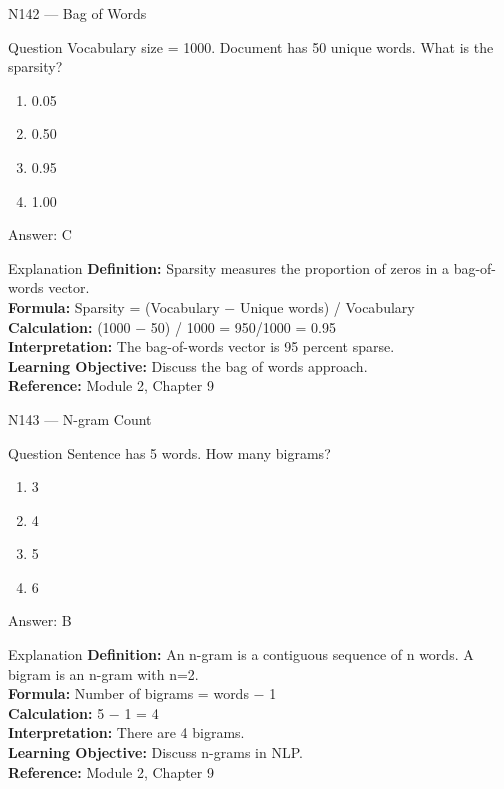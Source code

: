\documentclass[aspectratio=169,8pt]{beamer}
\begin{document}
	\begin{frame}{N142 --- Bag of Words}
		\begin{block}{Question}
			Vocabulary size = 1000. Document has 50 unique words. What is the sparsity?
			\begin{enumerate}
				\item 0.05
				\item 0.50
				\item 0.95
				\item 1.00
			\end{enumerate}
		\end{block}
		\begin{exampleblock}{Answer: C}\end{exampleblock}
		\begin{block}{Explanation}
			\textbf{Definition:} Sparsity measures the proportion of zeros in a bag-of-words vector.\\
			\textbf{Formula:} Sparsity = (Vocabulary $-$ Unique words) / Vocabulary\\
			\textbf{Calculation:} (1000 $-$ 50) / 1000 = 950/1000 = 0.95\\
			\textbf{Interpretation:} The bag-of-words vector is 95 percent sparse.\\
			\textbf{Learning Objective:} Discuss the bag of words approach.\\
			\textbf{Reference:} Module 2, Chapter 9
		\end{block}
	\end{frame}
	
	\begin{frame}{N143 --- N-gram Count}
		\begin{block}{Question}
			Sentence has 5 words. How many bigrams?
			\begin{enumerate}
				\item 3
				\item 4
				\item 5
				\item 6
			\end{enumerate}
		\end{block}
		\begin{exampleblock}{Answer: B}\end{exampleblock}
		\begin{block}{Explanation}
			\textbf{Definition:} An n-gram is a contiguous sequence of n words. A bigram is an n-gram with n=2.\\
			\textbf{Formula:} Number of bigrams = words $-$ 1\\
			\textbf{Calculation:} 5 $-$ 1 = 4\\
			\textbf{Interpretation:} There are 4 bigrams.\\
			\textbf{Learning Objective:} Discuss n-grams in NLP.\\
			\textbf{Reference:} Module 2, Chapter 9
		\end{block}
	\end{frame}
	
\end{document}
